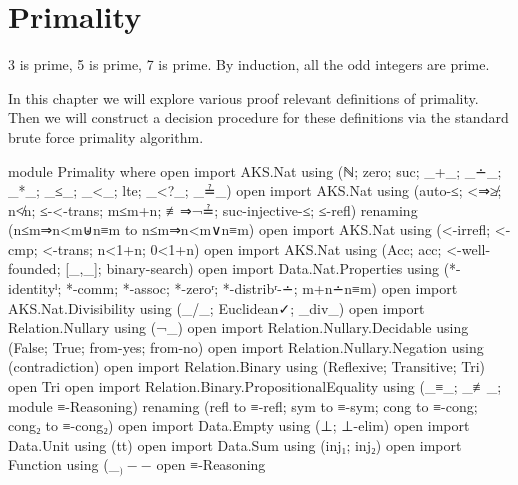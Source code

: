 \documentclass[./Thesis.tex]{subfiles}
\begin{document}
\chapter{Primality}
\label{chap:primality}

\epigraph{
  3 is prime, 5 is prime, 7 is prime. By induction, all the odd integers are
  prime.
}{\cite{leroy}}
In this chapter we will explore various proof relevant definitions of primality.
Then we will construct a decision procedure for these definitions via the
standard brute force primality algorithm.
\begin{code}[hide]
  module Primality where
  open import AKS.Nat using (ℕ; zero; suc; _+_; _∸_; _*_; _≤_; _<_; lte; _<?_; _≟_)
  open import AKS.Nat using (auto-≤; <⇒≱; n≮n; ≤-<-trans; m≤m+n; ≢⇒¬≟; suc-injective-≤; ≤-refl) renaming (n≤m⇒n<m⊎n≡m to n≤m⇒n<m∨n≡m)
  open import AKS.Nat using (<-irrefl; <-cmp; <-trans; n<1+n; 0<1+n)
  open import AKS.Nat using (Acc; acc; <-well-founded; [_,_]; binary-search)
  open import Data.Nat.Properties using (*-identityˡ; *-comm; *-assoc; *-zeroʳ; *-distribʳ-∸; m+n∸n≡m)
  open import AKS.Nat.Divisibility using (_/_; Euclidean✓; _div_)
  open import Relation.Nullary using (¬_)
  open import Relation.Nullary.Decidable using (False; True; from-yes; from-no)
  open import Relation.Nullary.Negation using (contradiction)
  open import Relation.Binary using (Reflexive; Transitive; Tri)
  open Tri
  open import Relation.Binary.PropositionalEquality
    using (_≡_; _≢_; module ≡-Reasoning)
    renaming (refl to ≡-refl; sym to ≡-sym; cong to ≡-cong; cong₂ to ≡-cong₂)
  open import Data.Empty using (⊥; ⊥-elim)
  open import Data.Unit using (tt)
  open import Data.Sum using (inj₁; inj₂)
  open import Function using (_$_) -- $
  open ≡-Reasoning
\end{code}
\end{document}
